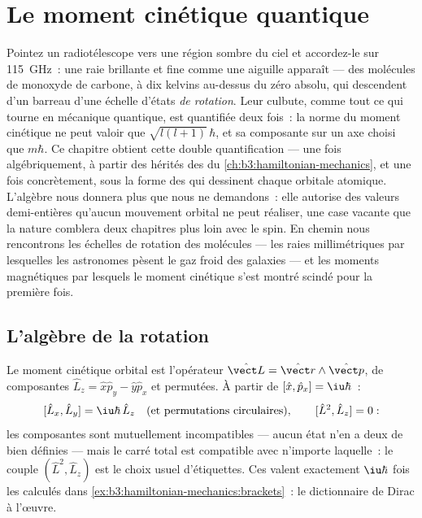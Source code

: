 \chapter{Le moment cinétique quantique}\label{ch:b3:quantum-angular-momentum}

Pointez un radiotélescope vers une région sombre du ciel et
accordez-le sur \qty{115}{GHz}~: une raie brillante et fine comme une aiguille
apparaît --- des molécules de monoxyde de carbone, à dix kelvins
au-dessus du zéro absolu, qui descendent d'un barreau d'une échelle
d'états \emph{de rotation}. Leur culbute, comme tout ce qui tourne en
mécanique quantique, est quantifiée deux fois~: la norme du moment
cinétique ne peut valoir que $\sqrt{l(l+1)}\,\hbar$, et sa composante
sur un axe choisi que $m\hbar$. Ce chapitre obtient cette double
quantification --- une fois algébriquement, à partir des 
hérités des  du \cref{ch:b3:hamiltonian-mechanics},
et une fois concrètement, sous la forme des  qui
dessinent chaque orbitale atomique. L'algèbre nous donnera plus que
nous ne demandons~: elle autorise des valeurs demi-entières qu'aucun
mouvement orbital ne peut réaliser, une case vacante que la nature
comblera deux chapitres plus loin avec le spin. En chemin nous
rencontrons les échelles de rotation des molécules --- les raies
millimétriques par lesquelles les astronomes pèsent le gaz froid des
galaxies --- et les moments magnétiques par lesquels le moment
cinétique s'est montré scindé pour la première fois.

\section{L'algèbre de la rotation}

\begin{definition}\label{def:b3:quantum-angular-momentum:operators}
Le moment cinétique orbital est l'opérateur $\hat{\vect L} =
\hat{\vect r}\wedge\hat{\vect p}$, de composantes $\hat L_z = \hat
x\hat p_y - \hat y\hat p_x$ et permutées. À partir de $[\hat x, \hat p_x] =
\iu\hbar$~:
\[
[\hat L_x, \hat L_y] = \iu\hbar\,\hat L_z
\quad\text{(et permutations circulaires)} , \qquad
[\hat L^2, \hat L_z] = 0 :
\]
les composantes sont mutuellement incompatibles --- aucun état n'en a
deux de bien définies --- mais le carré total est compatible avec
n'importe laquelle~: le couple $(\hat L^2, \hat L_z)$ est le choix
usuel d'étiquettes. Ces  valent exactement $\iu\hbar$ fois
les  calculés dans
\cref{ex:b3:hamiltonian-mechanics:brackets}~: le dictionnaire de Dirac
à l'œuvre.
\end{definition}


